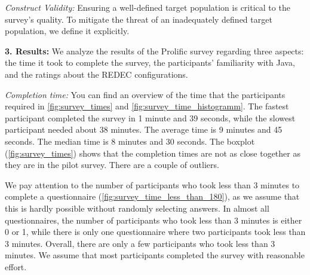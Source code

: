 \documentclass[%
class=scrreprt,
chapterprefix=false,%
open=right,%
twoside=true,%
paper=a4,%
logofile={Logo\_zentral\_farbig\_EN.png},%
thesistype=master,%
UKenglish,%
]{se2thesis}
\theoremstyle{definition}
\newcommand{\rdh}{REDEC\xspace}
\begin{document}
	\textit{Construct Validity:}
	Ensuring a well-defined target population is critical to the survey's quality.
	To mitigate the threat of an inadequately defined target population, we define it explicitly.
	
\textbf{3. Results:}
	We analyze the results of the Prolific survey regarding three aspects: the time it took to complete the survey, the participants' familiarity with Java, and the ratings about the \rdh configurations.

	\textit{Completion time:}
	You can find an overview of the time that the participants required in \autoref{fig:survey_times} and \autoref{fig:survey_time_histogramm}.
	The fastest participant completed the survey in 1 minute and 39 seconds, while the slowest participant needed about 38 minutes. 
	The average time is 9 minutes and 45 seconds. The median time is 8 minutes and 30 seconds. The boxplot (\autoref{fig:survey_times}) shows that the completion times are not as close together as they are in the pilot survey. There are a couple of outliers.
	
	We pay attention to the number of participants who took less than 3 minutes to complete a questionnaire (\autoref{fig:survey_time_less_than_180}), as we assume that this is hardly possible without randomly selecting answers. In almost all questionnaires, the number of participants who took less than 3 minutes is either 0 or 1, while there is only one questionnaire where two participants took less than 3 minutes.
	Overall, there are only a few participants who took less than 3 minutes. We assume that most participants completed the survey with reasonable effort.
		
\end{document}
